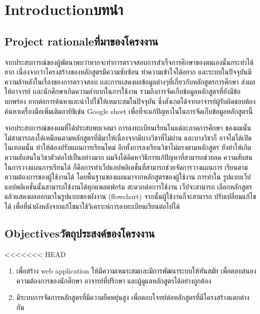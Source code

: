 \chapter{\ifenglish Introduction\else บทนำ\fi}

\section{\ifenglish Project rationale\else ที่มาของโครงงาน\fi}
{จากประสบการณ์ของผู้พัตนาพบว่าหากจะทำการตรวจสอบการสำเร็จการศึกษาของตนเองนั้นกระทำได้ยาก เนื่องจากว่าโครงสร้างของหลักสูตรมีความซับซ้อน ทำความเข้าใจได้อยาก และระบบในปัจจุบันมีความล้าหลังในเรื่องของการตรวจสอบ เเละการเเสดงผลข้อมูลต่างๆที่เกี่ยวกับหลักสูตรการศึกษา ส่งผลให้อาจารย์ เเละนักศึกษาเกิดความลําบากในการใช้งาน รวมถึงการจัดเก็บข้อมูลหลักสูตรที่ยังมีข้อบกพร่อง ยากต่อการค้นหาและนําไปใช้ให้เหมาะสมในปัจจุบัน ซึ่งสังเกตได้จากอาจารย์ผู้รับผิดชอบต้องค้นหาเครื่องมือเพิ่มเติมอาทิชิเช่น Google sheet เพื่อที่จะแก้ปัญหาในในการจัดเก็บข้อมูลหลักสูตรนี้ }


จากประสบการณ์ของผมที่ได้ประสบพบเจอมา การลงทะเบียนเรียนในแต่ละภาคการศึกษา
ของผมนั้นไม่สามารถลงได้เหมือนตามหลักสูตรที่มีมาให้เนื่องจากมีบางวิชาที่ไม่ผ่าน และบางวิชาก็
อาจไม่ได้เปิดในเทอมนั้น ทำให้ต้องปรับแผนการเรียนใหม่ อีกทั้งการลงเรียนวิชาไม่ตรงตามหลักสูตร
ยังทำให้เกิดความสับสนในวิชาตัวต่อไปเป็นอย่างมาก ผมจึงได้คิดหาวิธีการแก้ปัญหาที่สามารถช่วยลด
ความสับสนในการวางแผนการเรียนได้ ก็คือการทำเว็ปแอปพลิเคชั่นที่สามารถช่วยจัดการวางแผนการ
เรียนตามความต้องการของผู้ใช้งานได้ โดยพื้นฐานของแผนมาจากหลักสูตรของผู้ใช้งาน การทำใน
รูปแบบเว็ปแอปพลิเคชั่นนั้นสามารถใช้งานได้ทุกแพลตฟอร์ม สะดวกต่อการใช้งาน เว็ปจะสามารถ
เลือกหลักสูตรแล้วแสดงผลออกมาในรูปแบบของผังงาน (flowchart) จากนั้นผู้ใช้งานก็จะสามารถ
ปรับเปลี่ยนแก้ไขได้ เพื่อที่นำผังหลังจากแก้ไขมาใช้วิเคราะห์การลงทะเบียนเรียนต่อไปได้

\section{\ifenglish Objectives\else วัตถุประสงค์ของโครงงาน\fi}
<<<<<<< HEAD
\begin{enumerate}
    \item เพื่อสร้าง web application ให้มีความเหมาะสมเเละมีการพัฒนาระบบให้ทันสมัย เพื่อตอบสนองความต้องการของนักศึกษา อาจารย์ที่ปรึกษา และผู้ดูแลหลักสูตรได้อย่างถูกต้อง
    \item มีระบบการจัดการหลักสูตรที่มีความยืดหยุ่นสูง เพื่อตอบโจทย์ต่อหลักสูตรที่มีโครงสร้างแตกต่างกัน
\end{enumerate}

